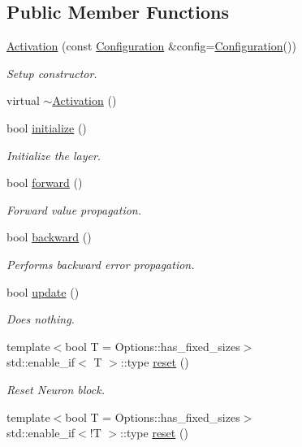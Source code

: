 \subsection*{Public Member Functions}
\begin{DoxyCompactItemize}
\item 
\hyperlink{classffnn_1_1layer_1_1_activation_a05dd515cd159a0ad39a02ad0fd6599bf}{Activation} (const \hyperlink{classffnn_1_1layer_1_1_activation_ac23a5193d2f33e6aef06c8571f956fbb}{Configuration} \&config=\hyperlink{classffnn_1_1layer_1_1_activation_ac23a5193d2f33e6aef06c8571f956fbb}{Configuration}())
\begin{DoxyCompactList}\small\item\em Setup constructor. \end{DoxyCompactList}\item 
virtual \hyperlink{classffnn_1_1layer_1_1_activation_a38963c402ef0ebecff769a05be8c062a}{$\sim$\-Activation} ()
\item 
bool \hyperlink{classffnn_1_1layer_1_1_activation_aa102b37183cacea58de3a33bf72ad3ff}{initialize} ()
\begin{DoxyCompactList}\small\item\em Initialize the layer. \end{DoxyCompactList}\item 
bool \hyperlink{classffnn_1_1layer_1_1_activation_a53a272bdc24ead93eb30cc6dc97e8e47}{forward} ()
\begin{DoxyCompactList}\small\item\em Forward value propagation. \end{DoxyCompactList}\item 
bool \hyperlink{classffnn_1_1layer_1_1_activation_a42c6cb4cc595429abcabbd83a54e73a3}{backward} ()
\begin{DoxyCompactList}\small\item\em Performs backward error propagation. \end{DoxyCompactList}\item 
bool \hyperlink{classffnn_1_1layer_1_1_activation_a8993804dd9caf941711c79de05167a1c}{update} ()
\begin{DoxyCompactList}\small\item\em Does nothing. \end{DoxyCompactList}\item 
{\footnotesize template$<$bool T = Options\-::has\-\_\-fixed\-\_\-sizes$>$ }\\std\-::enable\-\_\-if$<$ T $>$\-::type \hyperlink{classffnn_1_1layer_1_1_activation_acae612dea76c788537d75ba09cb3ced2}{reset} ()
\begin{DoxyCompactList}\small\item\em Reset Neuron block. \end{DoxyCompactList}\item 
{\footnotesize template$<$bool T = Options\-::has\-\_\-fixed\-\_\-sizes$>$ }\\std\-::enable\-\_\-if$<$!T $>$\-::type \hyperlink{classffnn_1_1layer_1_1_activation_a89853c9ce25aa3b6bb8932fd6fac2722}{reset} ()
\end{DoxyCompactItemize}
